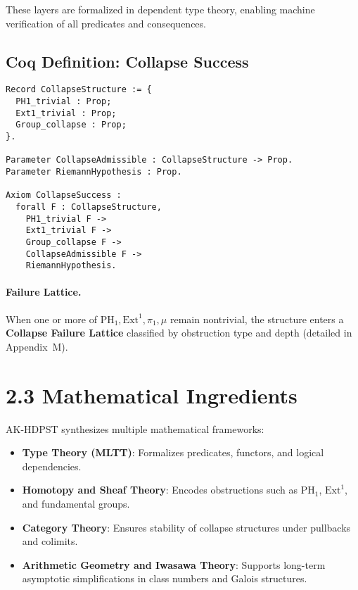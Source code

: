 \documentclass[11pt]{article}
\begin{document}
These layers are formalized in dependent type theory, enabling machine verification of all predicates and consequences.

\subsection*{Coq Definition: Collapse Success}

\begin{lstlisting}[language=Coq, caption=Collapse Success Type]
Record CollapseStructure := {
  PH1_trivial : Prop;
  Ext1_trivial : Prop;
  Group_collapse : Prop;
}.

Parameter CollapseAdmissible : CollapseStructure -> Prop.
Parameter RiemannHypothesis : Prop.

Axiom CollapseSuccess :
  forall F : CollapseStructure,
    PH1_trivial F ->
    Ext1_trivial F ->
    Group_collapse F ->
    CollapseAdmissible F ->
    RiemannHypothesis.
\end{lstlisting}

\paragraph{Failure Lattice.}  
When one or more of \( \mathrm{PH}_1, \mathrm{Ext}^1, \pi_1, \mu \) remain nontrivial, the structure enters a \textbf{Collapse Failure Lattice} classified by obstruction type and depth (detailed in Appendix~M).

\section*{2.3 Mathematical Ingredients}

AK-HDPST synthesizes multiple mathematical frameworks:

\begin{itemize}
  \item \textbf{Type Theory (MLTT)}: Formalizes predicates, functors, and logical dependencies.
  \item \textbf{Homotopy and Sheaf Theory}: Encodes obstructions such as \( \mathrm{PH}_1 \), \( \mathrm{Ext}^1 \), and fundamental groups.
  \item \textbf{Category Theory}: Ensures stability of collapse structures under pullbacks and colimits.
  \item \textbf{Arithmetic Geometry and Iwasawa Theory}: Supports long-term asymptotic simplifications in class numbers and Galois structures.
\end{itemize}
\end{document}
